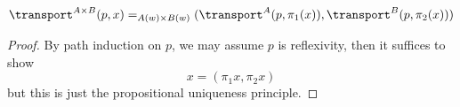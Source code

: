 \documentclass{amsart}
\begin{document}
\begin{lem}
  \[
    \transport^{A \times B}(p,x) =_{A(w) \times B(w)} (\transport^{A}(p,\pi_{1}(x)), \transport^{B}(p,\pi_{2}(x)))
  \]
\end{lem}
\begin{proof}
  By path induction on $p$, we may assume $p$ is reflexivity, then it suffices to show
  \[
    x = (\pi_{1}x,\pi_{2}x)
  \]
  but this is just the propositional uniqueness principle.
\end{proof}



\end{document}

